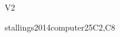 \begin{syllabus}
\begin{competences}{V2}
    \item {}
    \item {}
    \item {}
    \item {}
    \item {}
    \item {}
    \item {}
    \item {}
\end{competences}

\begin{unit}{\IASFoundationalConceptsinSecurity}{}{stallings2014computer}{25}{C2,C8}
\begin{topics}%
    \item \IASFoundationalConceptsinSecurityTopicCia
    \item \IASFoundationalConceptsinSecurityTopicConcepts
    \item \IASFoundationalConceptsinSecurityTopicAuthentication
    \item \IASFoundationalConceptsinSecurityTopicConcept
    \item \IASFoundationalConceptsinSecurityTopicEthics	
\end{topics}
\begin{learningoutcomes}
    \item \IASFoundationalConceptsinSecurityLOAnalyzeTheBalancing [\Familiarity]
    \item \IASFoundationalConceptsinSecurityLODescribeTheRisk [\Familiarity]
    \item \IASFoundationalConceptsinSecurityLOExplainTheAuthentication [\Familiarity]
    \item \IASFoundationalConceptsinSecurityLOExplainTheTrust [\Familiarity]
    \item \IASFoundationalConceptsinSecurityLORecognizeThat [\Familiarity]
\end{learningoutcomes}
\end{unit}


\end{syllabus}
